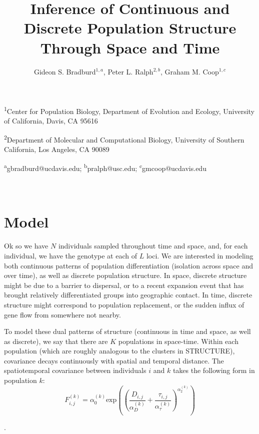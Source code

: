 \documentclass[12pt]{article}
\title{Inference of Continuous and Discrete Population Structure Through Space and Time}
\date{\vspace{-5ex}}
\author{Gideon S. Bradburd$^{1,a}$, Peter L. Ralph$^{2,b}$, Graham M. Coop$^{1,c}$}
\newcommand{\gb}[1]{{\it\color{ForestGreen}{(#1)}}}
\begin{document}
\maketitle

\textsuperscript{1}Center for Population Biology, Department of Evolution and Ecology, University of California, Davis, CA 95616

\textsuperscript{2}Department of Molecular and Computational Biology, University of Southern California, Los Angeles, CA 90089

\textsuperscript{a}gbradburd@ucdavis.edu; 
\textsuperscript{b}pralph@usc.edu;
\textsuperscript{c}gmcoop@ucdavis.edu\\\\\

\newpage

\section{Model}
Ok so we have $N$ individuals sampled throughout time and space, 
and, for each individual, we have the genotype at each of $L$ loci.
We are interested in modeling both continuous patterns of population differentiation 
(isolation across space and over time), as well as discrete population structure.
In space, discrete structure might be due to a barrier to dispersal, 
or to a recent expansion event that has brought relatively differentiated groups into geographic contact.
In time, discrete structure might correspond to population replacement, 
or the sudden influx of gene flow from somewhere not nearby.

To model these dual patterns of structure (continuous in time and space, as well as discrete), 
we say that there are $K$ populations in space-time.  
Within each population (which are roughly analogous to the clusters in STRUCTURE),
covariance decays continuously with spatial and temporal distance. 
The spatiotemporal covariance between individuals $i$ and $k$ takes the following form in population $k$:
\begin{equation}
\label{eq:pop_cov}
F^{(k)}_{i,j} = \alpha^{(k)}_0 \text{exp} \left(	  \left( \frac{D_{i,j}}{\alpha^{(k)}_D} + \frac{\tau_{i,j}}{\alpha^{(k)}_{\tau}} \right) ^{\alpha^{(k)}_2} \right)
\end{equation}

\gb{Peter, this form of covariance is a placeholder.  
I've been looking into different forms from Gneiting 2002, 
but would love some feedback on considerations 
when choosing which properties of which Matern functions are desirable}.
\end{document}
